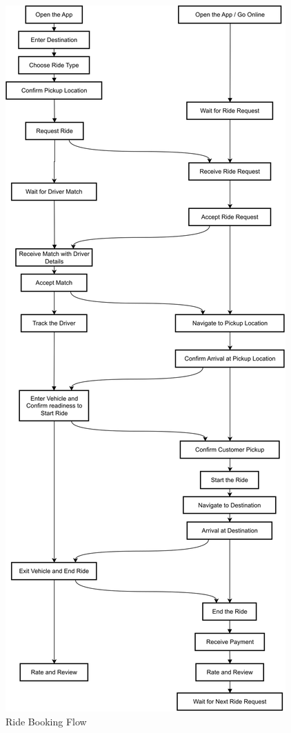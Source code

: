 \begin{figure}[h]
    \centering
    \includegraphics[width=0.95\linewidth, height=0.75\textheight, keepaspectratio]{data/ride-flow.svg}
    \caption{Ride Booking Flow}
    \label{fig:directSVG}
\end{figure}

